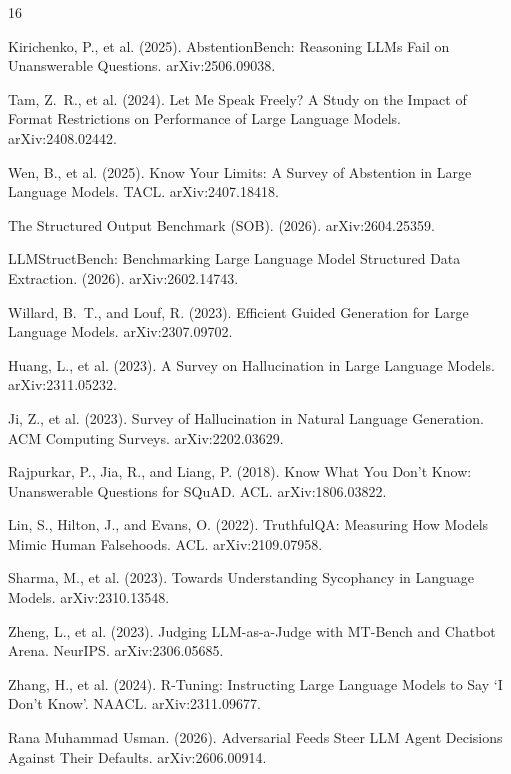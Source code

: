 \documentclass[11pt]{article}
\begin{document}
\begin{thebibliography}{16}

Kirichenko, P., et al. (2025). AbstentionBench: Reasoning LLMs Fail on Unanswerable Questions. arXiv:2506.09038.

Tam, Z.~R., et al. (2024). Let Me Speak Freely? A Study on the Impact of Format Restrictions on Performance of Large Language Models. arXiv:2408.02442.

Wen, B., et al. (2025). Know Your Limits: A Survey of Abstention in Large Language Models. TACL. arXiv:2407.18418.

The Structured Output Benchmark (SOB). (2026). arXiv:2604.25359.

LLMStructBench: Benchmarking Large Language Model Structured Data Extraction. (2026). arXiv:2602.14743.

Willard, B.~T., and Louf, R. (2023). Efficient Guided Generation for Large Language Models. arXiv:2307.09702.

Huang, L., et al. (2023). A Survey on Hallucination in Large Language Models. arXiv:2311.05232.

Ji, Z., et al. (2023). Survey of Hallucination in Natural Language Generation. ACM Computing Surveys. arXiv:2202.03629.

Rajpurkar, P., Jia, R., and Liang, P. (2018). Know What You Don't Know: Unanswerable Questions for SQuAD. ACL. arXiv:1806.03822.

Lin, S., Hilton, J., and Evans, O. (2022). TruthfulQA: Measuring How Models Mimic Human Falsehoods. ACL. arXiv:2109.07958.

Sharma, M., et al. (2023). Towards Understanding Sycophancy in Language Models. arXiv:2310.13548.

Zheng, L., et al. (2023). Judging LLM-as-a-Judge with MT-Bench and Chatbot Arena. NeurIPS. arXiv:2306.05685.

Zhang, H., et al. (2024). R-Tuning: Instructing Large Language Models to Say `I Don't Know'. NAACL. arXiv:2311.09677.

Rana Muhammad Usman. (2026). Adversarial Feeds Steer LLM Agent Decisions Against Their Defaults. arXiv:2606.00914.

\end{thebibliography}
\end{document}

